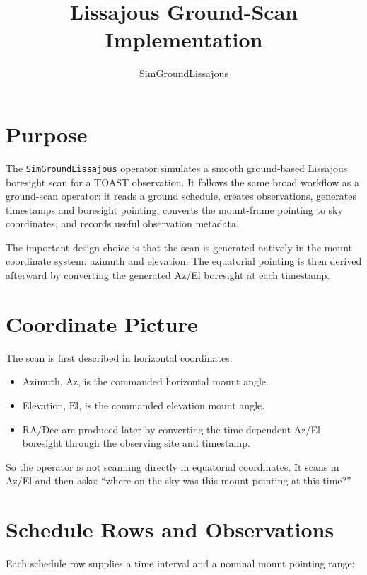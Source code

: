 \documentclass[11pt]{article}
\title{Lissajous Ground-Scan Implementation}
\author{SimGroundLissajous}
\date{}
\begin{document}
\maketitle

\section*{Purpose}

The \texttt{SimGroundLissajous} operator simulates a smooth ground-based
Lissajous boresight scan for a TOAST observation.  It follows the same broad
workflow as a ground-scan operator: it reads a ground schedule, creates
observations, generates timestamps and boresight pointing, converts the
mount-frame pointing to sky coordinates, and records useful observation
metadata.

The important design choice is that the scan is generated natively in the
mount coordinate system: azimuth and elevation.  The equatorial pointing is
then derived afterward by converting the generated Az/El boresight at each
timestamp.

\section*{Coordinate Picture}

The scan is first described in horizontal coordinates:

\begin{itemize}[leftmargin=*]
    \item Azimuth, \(\mathrm{Az}\), is the commanded horizontal mount angle.
    \item Elevation, \(\mathrm{El}\), is the commanded elevation mount angle.
    \item RA/Dec are produced later by converting the time-dependent Az/El
    boresight through the observing site and timestamp.
\end{itemize}

So the operator is not scanning directly in equatorial coordinates.  It scans
in Az/El and then asks: ``where on the sky was this mount pointing at this
time?''

\section*{Schedule Rows and Observations}

Each schedule row supplies a time interval and a nominal mount pointing range:
\end{document}
